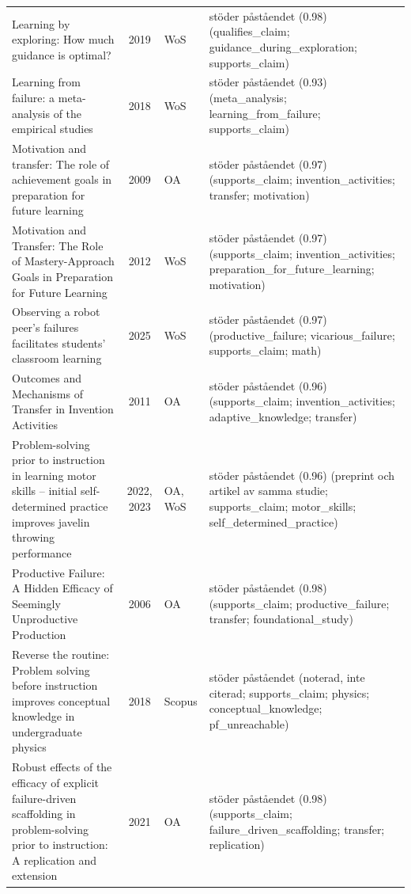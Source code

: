\begin{longtable}{@{}%
  >{\raggedright\arraybackslash}p{}c%
  >{\raggedright\arraybackslash}p{}%
  >{\raggedright\arraybackslash\footnotesize}p{}@{}}
Learning by exploring: How much guidance is optimal? & 2019 & WoS & stöder påståendet (0.98) (qualifies\_\allowbreak{}claim; guidance\_\allowbreak{}during\_\allowbreak{}exploration; supports\_\allowbreak{}claim) \\
Learning from failure: a meta-analysis of the empirical studies & 2018 & WoS & stöder påståendet (0.93) (meta\_\allowbreak{}analysis; learning\_\allowbreak{}from\_\allowbreak{}failure; supports\_\allowbreak{}claim) \\
Motivation and transfer: The role of achievement goals in preparation for future learning & 2009 & OA & stöder påståendet (0.97) (supports\_\allowbreak{}claim; invention\_\allowbreak{}activities; transfer; motivation) \\
Motivation and Transfer: The Role of Mastery-Approach Goals in Preparation for Future Learning & 2012 & WoS & stöder påståendet (0.97) (supports\_\allowbreak{}claim; invention\_\allowbreak{}activities; preparation\_\allowbreak{}for\_\allowbreak{}future\_\allowbreak{}learning; motivation) \\
Observing a robot peer's failures facilitates students' classroom learning & 2025 & WoS & stöder påståendet (0.97) (productive\_\allowbreak{}failure; vicarious\_\allowbreak{}failure; supports\_\allowbreak{}claim; math) \\
Outcomes and Mechanisms of Transfer in Invention Activities & 2011 & OA & stöder påståendet (0.96) (supports\_\allowbreak{}claim; invention\_\allowbreak{}activities; adaptive\_\allowbreak{}knowledge; transfer) \\
Problem-solving prior to instruction in learning motor skills -- initial self-determined practice improves javelin throwing performance & 2022, 2023 & OA, WoS & stöder påståendet (0.96) (preprint och artikel av samma studie; supports\_\allowbreak{}claim; motor\_\allowbreak{}skills; self\_\allowbreak{}determined\_\allowbreak{}practice) \\
Productive Failure: A Hidden Efficacy of Seemingly Unproductive Production & 2006 & OA & stöder påståendet (0.98) (supports\_\allowbreak{}claim; productive\_\allowbreak{}failure; transfer; foundational\_\allowbreak{}study) \\
Reverse the routine: Problem solving before instruction improves conceptual knowledge in undergraduate physics & 2018 & Scopus & stöder påståendet (noterad, inte citerad; supports\_\allowbreak{}claim; physics; conceptual\_\allowbreak{}knowledge; pf\_\allowbreak{}unreachable) \\
Robust effects of the efficacy of explicit failure-driven scaffolding in problem-solving prior to instruction: A replication and extension & 2021 & OA & stöder påståendet (0.98) (supports\_\allowbreak{}claim; failure\_\allowbreak{}driven\_\allowbreak{}scaffolding; transfer; replication) \\

\end{longtable}
